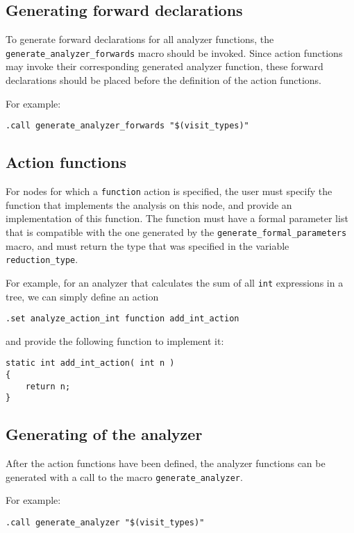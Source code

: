 \subsection{Generating forward declarations}
\begin{sloppypar}
To generate forward declarations for all analyzer functions, the
\verb'generate_analyzer_forwards' macro should be invoked.
Since action functions may invoke their corresponding generated analyzer
function, these forward declarations should be placed before the
definition of the action functions.
\end{sloppypar}
\par
For example:
\begin{verbatim}
.call generate_analyzer_forwards "$(visit_types)"
\end{verbatim}
\subsection{Action functions}
For nodes for which a {\tt function} action is specified, the user
must specify the function that implements the analysis on this node,
and provide an implementation of this function.  The function must have
a formal parameter list that is compatible with the one generated by the
\verb'generate_formal_parameters' macro, and must return the type that
was specified in the variable \verb'reduction_type'.

For example, for an analyzer that calculates the sum of all {\tt int}
expressions in a tree, we can simply define an action
\begin{verbatim}
.set analyze_action_int function add_int_action
\end{verbatim}
and provide the following function to implement it:
\begin{verbatim}
static int add_int_action( int n )
{
    return n;
}
\end{verbatim}

\subsection{Generating of the analyzer}
After the action functions have been defined, the analyzer functions can
be generated with a call to the macro \verb'generate_analyzer'.
\par
For example:
\begin{verbatim}
.call generate_analyzer "$(visit_types)"
\end{verbatim}
